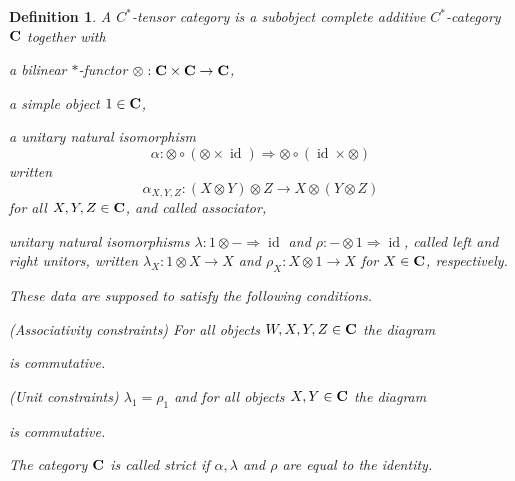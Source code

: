 \documentclass[a4paper]{amsart}
\newcommand*{\BC}{{\bf C}}
\DeclareMathOperator{\id}{id}
\newenvironment{bnum}
{\begin{list}{}
    {\setlength{\labelwidth}{15pt}
     \setlength{\leftmargin}{\labelwidth}
    }
}
{\end{list}}
\numberwithin{equation}{section}
\theoremstyle{change}
\newtheorem{definition}[theorem]{Definition}
\begin{document}
\begin{definition} \label{deflinearcstartensor}
A \emph{$ C^* $-tensor category} is a subobject complete additive $ C^* $-category $ \BC $ together with 
\begin{bnum}
\item[$ \bullet $] a bilinear $ * $-functor $ \otimes: \BC \times \BC \rightarrow \BC $, 
\item[$ \bullet $] a simple object $ 1 \in \BC $, 
\item[$ \bullet $] a unitary natural isomorphism 
$$ 
\alpha: \otimes \circ (\otimes \times \id) \Rightarrow \otimes \circ (\id \times \otimes) 
$$ 
written 
$$ 
\alpha_{X, Y, Z}: (X \otimes Y) \otimes Z \rightarrow X \otimes (Y \otimes Z)
$$ 
for all $ X, Y, Z \in \BC $, and called associator, 
\item[$ \bullet $] unitary natural isomorphisms $ \lambda: 1 \otimes - \Rightarrow \id $ and $ \rho: - \otimes 1 \Rightarrow \id $, called left and right unitors, written $ \lambda_X: 1 \otimes X \rightarrow X $ and $ \rho_X: X \otimes 1 \rightarrow X $ for $ X \in \BC $, respectively. 
\end{bnum}
These data are supposed to satisfy the following conditions. 
\begin{bnum}
\item[$\bullet$] (Associativity constraints) For all objects $ W, X, Y, Z \in \BC $ the diagram
\begin{center}
\end{center}
is commutative. 
\item[$\bullet$] (Unit constraints) $ \lambda_1 = \rho_1 $ and for all objects $ X, Y \in \BC $ the diagram 
\begin{center}
\end{center}
is commutative.  
\end{bnum} 
The category $ \BC $ is called strict if $ \alpha, \lambda $ and $ \rho $ are equal to the identity. 
\end{definition} 
\end{document}
